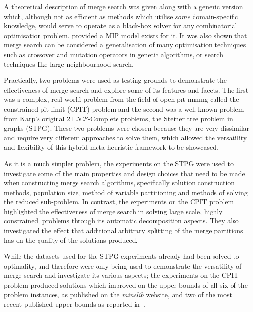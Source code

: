 \documentclass[authoryear,11pt,square,number,times,super,comma]{elsarticle}
\newcommand{\NP}{$\mathcal{NP}$}
\begin{document}
A theoretical description of merge search was given along with a generic version which, although not as efficient as methods which utilise \emph{some} domain-specific knowledge, would serve to operate as a black-box solver for any combinatorial optimisation problem, provided a MIP model exists for it. It was also shown that merge search can be considered a generalisation of many optimisation techniques such as crossover and mutation operators in genetic algorithms, or search techniques like large neighbourhood search.

Practically, two problems were used as testing-grounds to demonstrate the effectiveness of merge search and explore some of its features and facets. The first was a complex, real-world problem from the field of open-pit mining called the constrained pit-limit (CPIT) problem and the second was a well-known problem from Karp's original 21 \NP-Complete problems, the Steiner tree problem in graphs (STPG). These two problems were chosen because they are very dissimilar and require very different approaches to solve them, which allowed the versatility and flexibility of this hybrid meta-heuristic framework to be showcased.

As it is a much simpler problem, the experiments on the STPG were used to investigate some of the main properties and design choices that need to be made when constructing merge search algorithms, specifically solution construction methods, population size, method of variable partitioning and methods of solving the reduced sub-problem. In contrast, the experiments on the CPIT problem highlighted the effectiveness of merge search in solving large scale, highly constrained, problems through its automatic decomposition aspects. They also investigated the effect that additional arbitrary splitting of the merge partitions has on the quality of the solutions produced.

While the datasets used for the STPG experiments already had been solved to optimality, and therefore were only being used to demonstrate the versatility of merge search and investigate its various aspects; the experiments on the CPIT problem produced solutions which improved on the upper-bounds of all six of the problem instances, as published on the \emph{minelib} website, and two of the most recent published upper-bounds as reported in~\cite{minelib-improved}.

\smallskip
\end{document}
